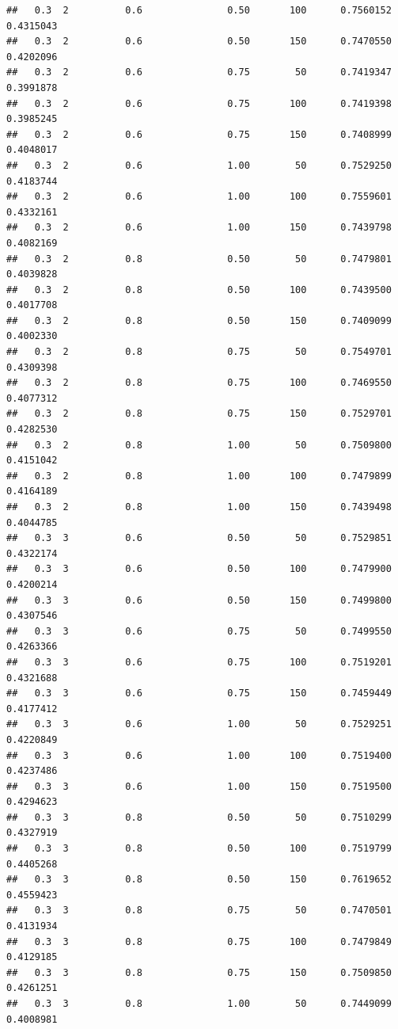 \documentclass[
]{book}
\theoremstyle{break}
\theoremstyle{definition}
\theoremstyle{definition}
\theoremstyle{definition}
\theoremstyle{remark}
\begin{document}
\begin{verbatim}
##   0.3  2          0.6               0.50       100      0.7560152  0.4315043
##   0.3  2          0.6               0.50       150      0.7470550  0.4202096
##   0.3  2          0.6               0.75        50      0.7419347  0.3991878
##   0.3  2          0.6               0.75       100      0.7419398  0.3985245
##   0.3  2          0.6               0.75       150      0.7408999  0.4048017
##   0.3  2          0.6               1.00        50      0.7529250  0.4183744
##   0.3  2          0.6               1.00       100      0.7559601  0.4332161
##   0.3  2          0.6               1.00       150      0.7439798  0.4082169
##   0.3  2          0.8               0.50        50      0.7479801  0.4039828
##   0.3  2          0.8               0.50       100      0.7439500  0.4017708
##   0.3  2          0.8               0.50       150      0.7409099  0.4002330
##   0.3  2          0.8               0.75        50      0.7549701  0.4309398
##   0.3  2          0.8               0.75       100      0.7469550  0.4077312
##   0.3  2          0.8               0.75       150      0.7529701  0.4282530
##   0.3  2          0.8               1.00        50      0.7509800  0.4151042
##   0.3  2          0.8               1.00       100      0.7479899  0.4164189
##   0.3  2          0.8               1.00       150      0.7439498  0.4044785
##   0.3  3          0.6               0.50        50      0.7529851  0.4322174
##   0.3  3          0.6               0.50       100      0.7479900  0.4200214
##   0.3  3          0.6               0.50       150      0.7499800  0.4307546
##   0.3  3          0.6               0.75        50      0.7499550  0.4263366
##   0.3  3          0.6               0.75       100      0.7519201  0.4321688
##   0.3  3          0.6               0.75       150      0.7459449  0.4177412
##   0.3  3          0.6               1.00        50      0.7529251  0.4220849
##   0.3  3          0.6               1.00       100      0.7519400  0.4237486
##   0.3  3          0.6               1.00       150      0.7519500  0.4294623
##   0.3  3          0.8               0.50        50      0.7510299  0.4327919
##   0.3  3          0.8               0.50       100      0.7519799  0.4405268
##   0.3  3          0.8               0.50       150      0.7619652  0.4559423
##   0.3  3          0.8               0.75        50      0.7470501  0.4131934
##   0.3  3          0.8               0.75       100      0.7479849  0.4129185
##   0.3  3          0.8               0.75       150      0.7509850  0.4261251
##   0.3  3          0.8               1.00        50      0.7449099  0.4008981

\end{verbatim}
\end{document}
